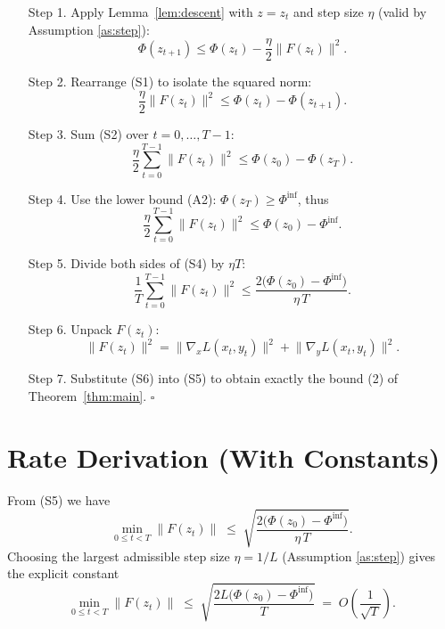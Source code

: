 \documentclass{article}
\begin{document}
\begin{enumerate}
\item[Step 1.] Apply Lemma~\ref{lem:descent} with $z=z_t$ and step size $\eta$ (valid by Assumption \ref{as:step}):
\[
\Phi(z_{t+1})
\le \Phi(z_t)-\frac{\eta}{2}\|F(z_t)\|^{2}.
\tag{S1}
\]

\item[Step 2.] Rearrange (S1) to isolate the squared norm:
\[
\frac{\eta}{2}\|F(z_t)\|^{2}
\le \Phi(z_t)-\Phi(z_{t+1}).
\tag{S2}
\]

\item[Step 3.] Sum (S2) over $t=0,\dots,T-1$:
\[
\frac{\eta}{2}\sum_{t=0}^{T-1}\|F(z_t)\|^{2}
\le \Phi(z_0)-\Phi(z_T).
\tag{S3}
\]

\item[Step 4.] Use the lower bound (A2): $\Phi(z_T)\ge\Phi^{\inf}$, thus
\[
\frac{\eta}{2}\sum_{t=0}^{T-1}\|F(z_t)\|^{2}
\le \Phi(z_0)-\Phi^{\inf}.
\tag{S4}
\]

\item[Step 5.] Divide both sides of (S4) by $\eta T$:
\[
\frac{1}{T}\sum_{t=0}^{T-1}\|F(z_t)\|^{2}
\le \frac{2\bigl(\Phi(z_0)-\Phi^{\inf}\bigr)}{\eta\,T}.
\tag{S5}
\]

\item[Step 6.] Unpack $F(z_t)$:
\[
\|F(z_t)\|^{2}
= \bigl\|\nabla_x L(x_t,y_t)\bigr\|^{2}
  +\bigl\|\nabla_y L(x_t,y_t)\bigr\|^{2}.
\tag{S6}
\]

\item[Step 7.] Substitute (S6) into (S5) to obtain exactly the bound (2) of Theorem~\ref{thm:main}.
\hfill $\square$
\end{enumerate}

\section*{Rate Derivation (With Constants)}
From (S5) we have
\[
\min_{0\le t<T}\|F(z_t)\|
\;\le\;
\sqrt{\frac{2\bigl(\Phi(z_0)-\Phi^{\inf}\bigr)}{\eta\,T}}.
\]
Choosing the largest admissible step size $\eta=1/L$ (Assumption \ref{as:step}) gives the explicit constant
\[
\min_{0\le t<T}\|F(z_t)\|
\;\le\;
\sqrt{\frac{2L\bigl(\Phi(z_0)-\Phi^{\inf}\bigr)}{T}}
\;=\;O\!\left(\frac{1}{\sqrt{T}}\right).
\]
\end{document}
